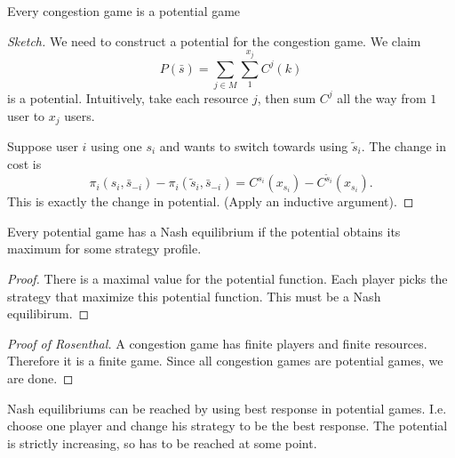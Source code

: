 \begin{alemma}{}{}
    Every congestion game is a potential game
\end{alemma}

\begin{proof}[Sketch]
    We need to construct a potential for the congestion game. We claim \[
    P(\bar{s})= \sum_{j\in M}\sum_{1}^{x_j}C^j(k) 
    \]is a potential.
    Intuitively, take each resource $j$, then sum $C^j$ all the way from $1$ user to $x_j$ users.

    Suppose user $i$ using one $s_i$ and wants to switch towards using $\tilde{s}_i$. The change in cost is \[
        \pi_i(s_i,\bar{s}_{-i})-\pi_i(\tilde{s}_i,\bar{s}_{-i})=C^{s_i}(x_{s_i})-C^{\tilde{s}_i}(x_{s_i}).
    \]
    This is exactly the change in potential. (Apply an inductive argument).
\end{proof}
\begin{atheorem}{}{}
    Every potential game has a Nash equilibrium if the potential obtains its maximum for some strategy profile.
\end{atheorem}
\begin{proof}
    There is a maximal value for the potential function. Each player picks the strategy that maximize this potential function. This must be a Nash equilibirum.
\end{proof}

\begin{proof}[Proof of Rosenthal]
    A congestion game has finite players and finite resources. Therefore it is a finite game. Since all congestion games are potential games, we are done.
\end{proof}


Nash equilibriums can be reached by using best response in potential games. I.e. choose one player and change his strategy to be the best response. The potential is strictly increasing, so has to be reached at some point. 